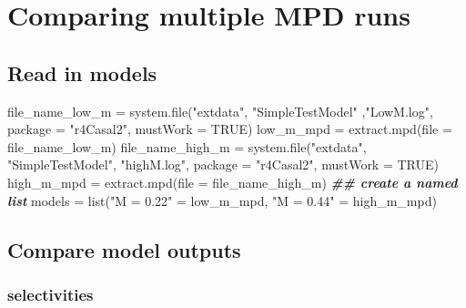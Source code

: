 \documentclass[
]{book}
\newenvironment{Shaded}{\begin{snugshade}}{\end{snugshade}}
\newcommand{\AttributeTok}[1]{\textcolor[rgb]{0.77,0.63,0.00}{#1}}
\newcommand{\ConstantTok}[1]{\textcolor[rgb]{0.00,0.00,0.00}{#1}}
\newcommand{\DocumentationTok}[1]{\textcolor[rgb]{0.56,0.35,0.01}{\textbf{\textit{#1}}}}
\newcommand{\FunctionTok}[1]{\textcolor[rgb]{0.00,0.00,0.00}{#1}}
\newcommand{\NormalTok}[1]{#1}
\newcommand{\OtherTok}[1]{\textcolor[rgb]{0.56,0.35,0.01}{#1}}
\newcommand{\StringTok}[1]{\textcolor[rgb]{0.31,0.60,0.02}{#1}}
\begin{document}
\hypertarget{summarisemultipleinputs}{%
\chapter{Comparing multiple MPD runs}\label{summarisemultipleinputs}}

\hypertarget{read-in-models}{%
\section{Read in models}\label{read-in-models}}

\begin{Shaded}
\begin{Highlighting}[]
\NormalTok{file\_name\_low\_m }\OtherTok{=} \FunctionTok{system.file}\NormalTok{(}\StringTok{"extdata"}\NormalTok{, }\StringTok{"SimpleTestModel"}\NormalTok{ ,}\StringTok{"LowM.log"}\NormalTok{, }
                              \AttributeTok{package =} \StringTok{"r4Casal2"}\NormalTok{, }\AttributeTok{mustWork =} \ConstantTok{TRUE}\NormalTok{)}
\NormalTok{low\_m\_mpd }\OtherTok{=} \FunctionTok{extract.mpd}\NormalTok{(}\AttributeTok{file =}\NormalTok{ file\_name\_low\_m)}
\NormalTok{file\_name\_high\_m }\OtherTok{=} \FunctionTok{system.file}\NormalTok{(}\StringTok{"extdata"}\NormalTok{, }\StringTok{"SimpleTestModel"}\NormalTok{, }\StringTok{"highM.log"}\NormalTok{, }
                               \AttributeTok{package =} \StringTok{"r4Casal2"}\NormalTok{, }\AttributeTok{mustWork =} \ConstantTok{TRUE}\NormalTok{)}
\NormalTok{high\_m\_mpd }\OtherTok{=} \FunctionTok{extract.mpd}\NormalTok{(}\AttributeTok{file =}\NormalTok{ file\_name\_high\_m)}
\DocumentationTok{\#\# create a named list}
\NormalTok{models }\OtherTok{=} \FunctionTok{list}\NormalTok{(}\StringTok{"M = 0.22"} \OtherTok{=}\NormalTok{ low\_m\_mpd, }\StringTok{"M = 0.44"} \OtherTok{=}\NormalTok{ high\_m\_mpd)}
\end{Highlighting}
\end{Shaded}

\hypertarget{compare-model-outputs}{%
\section{Compare model outputs}\label{compare-model-outputs}}

\hypertarget{selectivities}{%
\subsection{selectivities}\label{selectivities}}
\end{document}
